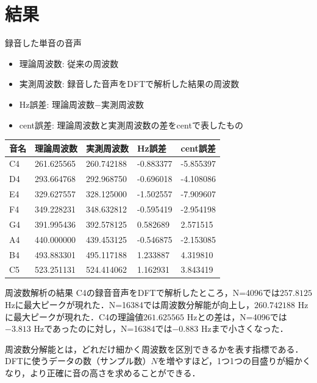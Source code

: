\documentclass[dvipdfmx,uplatex]{beamer}
\begin{document}
\section{結果}

\begin{frame}{録音した単音の音声}
  \begin{itemize}
    \item 理論周波数: 従来の周波数
    \item 実測周波数: 録音した音声をDFTで解析した結果の周波数
    \item Hz誤差: 理論周波数$-$実測周波数
    \item cent誤差: 理論周波数と実測周波数の差をcentで表したもの
  \end{itemize}
\begin{table}[!ht]
    \centering
    \begin{tabular}{|l|l|l|l|l|}
    \hline
        音名 & 理論周波数 & 実測周波数 & Hz誤差 & cent誤差 \\ \hline
        C4 & 261.625565 & 260.742188 & -0.883377 & -5.855397 \\ \hline
        D4 & 293.664768 & 292.968750 & -0.696018 & -4.108086 \\ \hline
        E4 & 329.627557 & 328.125000 & -1.502557 & -7.909607 \\ \hline
        F4 & 349.228231 & 348.632812 & -0.595419 & -2.954198 \\ \hline
        G4 & 391.995436 & 392.578125 & 0.582689 & 2.571515 \\ \hline
        A4 & 440.000000 & 439.453125 & -0.546875 & -2.153085 \\ \hline
        B4 & 493.883301 & 495.117188 & 1.233887 & 4.319810 \\ \hline
        C5 & 523.251131 & 524.414062 & 1.162931 & 3.843419 \\ \hline
    \end{tabular}
\end{table}
\end{frame}

\begin{frame}{周波数解析の結果}
  C4の録音音声をDFTで解析したところ，N=4096では$257.8125$ Hzに最大ピークが現れた．N=16384では周波数分解能が向上し，$260.742188$ Hzに最大ピークが現れた．C4の理論値$261.625565$ Hzとの差は，N=4096では$-3.813$ Hzであったのに対し，N=16384では$-0.883$ Hzまで小さくなった．

  \footnotesize
  周波数分解能とは，どれだけ細かく周波数を区別できるかを表す指標である．
  DFTに使うデータの数（サンプル数）$N$を増やすほど，1つ1つの目盛りが細かくなり，より正確に音の高さを求めることができる．
\end{frame}
\end{document}

